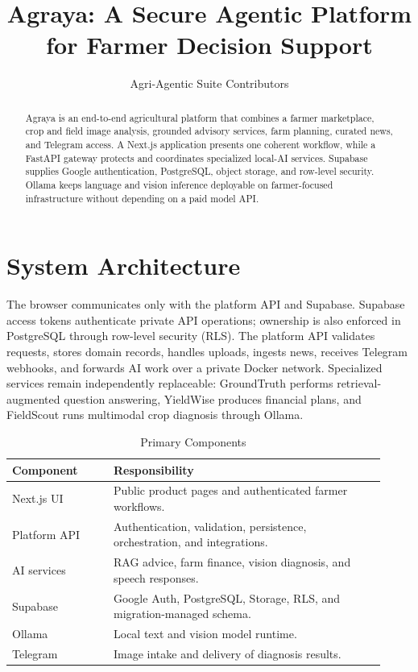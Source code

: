 \documentclass[10pt,journal]{IEEEtran}
\title{Agraya: A Secure Agentic Platform for Farmer Decision Support}
\author{Agri-Agentic Suite Contributors}
\begin{document}
\maketitle

\begin{abstract}
Agraya is an end-to-end agricultural platform that combines a farmer marketplace,
crop and field image analysis, grounded advisory services, farm planning, curated
news, and Telegram access. A Next.js application presents one coherent workflow,
while a FastAPI gateway protects and coordinates specialized local-AI services.
Supabase supplies Google authentication, PostgreSQL, object storage, and row-level
security. Ollama keeps language and vision inference deployable on farmer-focused
infrastructure without depending on a paid model API.
\end{abstract}

\section{System Architecture}
The browser communicates only with the platform API and Supabase. Supabase access
tokens authenticate private API operations; ownership is also enforced in
PostgreSQL through row-level security (RLS). The platform API validates requests,
stores domain records, handles uploads, ingests news, receives Telegram webhooks,
and forwards AI work over a private Docker network. Specialized services remain
independently replaceable: GroundTruth performs retrieval-augmented question
answering, YieldWise produces financial plans, and FieldScout runs multimodal crop
diagnosis through Ollama.

\begin{table}[h]
\caption{Primary Components}
\centering
\begin{tabular}{p{0.25\linewidth}p{0.67\linewidth}}
\toprule
Component & Responsibility \\
\midrule
Next.js UI & Public product pages and authenticated farmer workflows. \\
Platform API & Authentication, validation, persistence, orchestration, and integrations. \\
AI services & RAG advice, farm finance, vision diagnosis, and speech responses. \\
Supabase & Google Auth, PostgreSQL, Storage, RLS, and migration-managed schema. \\
Ollama & Local text and vision model runtime. \\
Telegram & Image intake and delivery of diagnosis results. \\
\bottomrule
\end{tabular}
\end{table}
\end{document}
